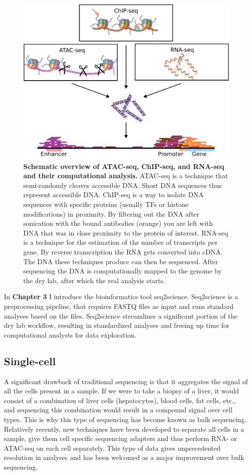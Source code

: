 \begin{figure}
    \center
    \includegraphics[width=0.75\linewidth]{ch.introduction/imgs/analysis.png}
    \caption{\textbf{Schematic overview of ATAC-seq, ChIP-seq, and RNA-seq and their computational analysis.} ATAC-seq is a technique that semi-randomly cleaves accessible DNA. Short DNA sequences thus represent accessible DNA. ChIP-seq is a way to isolate DNA sequences with specific proteins (usually TFs or histone modifications) in proximity. By filtering out the DNA after sonication with the bound antibodies (orange) you are left with DNA that was in close proximity to the protein of interest. RNA-seq is a technique for the estimation of the number of transcripts per gene. By reverse transcription the RNA gets converted into cDNA. The DNA these techniques produce can then be sequenced. After sequencing the DNA is computationally mapped to the genome by the dry lab, after which the real analysis starts. }
    \label{fig:analysis}
\end{figure}

In \textbf{Chapter 3} I introduce the bioinformatics tool seq2science. Seq2science is a preprocessing pipeline, that requires FASTQ files as input and runs standard analyses based on the files. Seq2science streamlines a significant portion of the dry lab workflow, resulting in standardized analyses and freeing up time for computational analysts for data exploration.

\subsection{Single-cell}

A significant drawback of traditional sequencing is that it aggregates the signal of all the cells present in a sample. If we were to take a biopsy of a liver, it would consist of a combination of liver cells (hepatocytes), blood cells, fat cells, etc., and sequencing this combination would result in a compound signal over cell types. This is why this type of sequencing has become known as bulk sequencing. Relatively recently, new techniques have been developed to separate all cells in a sample, give them cell specific sequencing adapters and thus perform RNA- or ATAC-seq on each cell separately\cite{Buenrostro2015_sc,Tang2009}. This type of data gives unprecedented resolution in analyses and has been welcomed as a major improvement over bulk sequencing.

